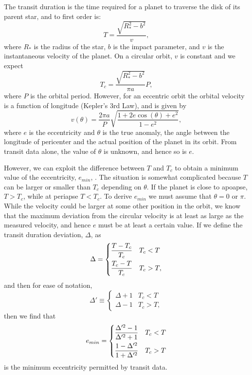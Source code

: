 The transit duration is the time required for a planet to traverse the
disk of its parent star, and to first order is:
\begin{equation}\label{eq:duration}
T = \frac{\sqrt{R_*^2 - b^2}}{v},
\end{equation}
where $R_*$ is the radius of the star, $b$ is the impact parameter,
and $v$ is the instantaneous velocity of the planet. On a circular
orbit, $v$ is constant and we expect
\begin{equation}\label{eq:durcirc}
T_c = \frac{\sqrt{R_*^2 - b^2}}{\pi a}P,
\end{equation}
where $P$ is the orbital period. However, for an eccentric orbit the
orbital velocity is a function of longitude (Kepler's 3rd Law), and is
given by
\begin{equation}\label{eq:velocity}
v(\theta) = \frac{2\pi a}{P}\sqrt{\frac{1 + 2e\cos(\theta) + e^2}{1-e^2}},
\end{equation}
where $e$ is the eccentricity and $\theta$ is the true anomaly, the
angle between the longitude of pericenter and the actual position of
the planet in its orbit. From transit data alone, the value of
$\theta$ is unknown, and hence so is $e$.

However, we can exploit the difference between $T$ and $T_c$ to obtain
a minimum value of the eccentricity, $e_{min}$, \cite{Barnes07}. The
situation is somewhat complicated because $T$ can be larger or smaller
than $T_c$ depending on $\theta$. If the planet is close to apoapse,
$T > T_c$, while at periapse $T < T_c$. To derive $e_{min}$ we must
assume that $\theta = 0$ or $\pi$. While the velocity could be larger
at some other position in the orbit, we know that the maximum
deviation from the circular velocity is at least as large as the
measured velocity, and hence $e$ must be at least a certain value. If
we define the transit duration deviation, $\Delta$, as
\begin{equation}\label{eq:tdd}
\Delta = \begin{dcases} \frac{T-T_c}{T_c} & T_c < T \\ \frac{T_c - T}{T_c} & T_c > T, \end{dcases}
\end{equation}
and then for ease of notation,
\begin{equation}\label{eq:deltaprime}
\Delta' \equiv \begin{cases} \Delta + 1 & T_c < T \\ \Delta - 1 & T_c > T, \end{cases}
\end{equation}
then we find that
\begin{equation}\label{eq:emin}
e_{min} = \begin{dcases} \frac{\Delta'^2 - 1}{\Delta'^2 + 1} & T_c < T \\ \frac{1 - \Delta'^2}{1 + \Delta'^2} & T_c > T \end{dcases}
\end{equation}
is the minimum eccentricity permitted by transit data.

